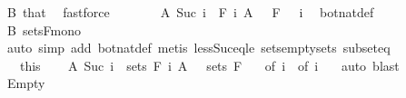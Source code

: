 \begin{isabellebody}
\ B\ that\ \isamarkupfalse%
\ fastforce\isanewline
\ \ \ \ \isamarkupfalse%
\ \isamarkupfalse%
\ {\isachardoublequoteopen}A\ {\isacharparenleft}{\kern0pt}Suc\ i{\isacharparenright}{\kern0pt}\ {\isasymin}\ F\ i{\isachardoublequoteclose}\ {\isachardoublequoteopen}A\ {}\ {\isasymin}\ F\ {}{\isachardoublequoteclose}\ \ i\ \isamarkupfalse%
\ bot{\isacharunderscore}{\kern0pt}nat{\isacharunderscore}{\kern0pt}def\ \isamarkupfalse%
\ B\ sets{\isacharunderscore}{\kern0pt}F{\isacharunderscore}{\kern0pt}mono\ \isamarkupfalse%
\ {\isacharparenleft}{\kern0pt}auto\ simp\ add{\isacharcolon}{\kern0pt}\ bot{\isacharunderscore}{\kern0pt}nat{\isacharunderscore}{\kern0pt}def{\isacharparenright}{\kern0pt}\ {\isacharparenleft}{\kern0pt}metis\ less{\isacharunderscore}{\kern0pt}Suc{\isacharunderscore}{\kern0pt}eq{\isacharunderscore}{\kern0pt}le\ sets{\isachardot}{\kern0pt}empty{\isacharunderscore}{\kern0pt}sets\ subset{\isacharunderscore}{\kern0pt}eq{\isacharparenright}{\kern0pt}\isanewline
\ \ \isacommand{{\isacharbraceright}{\kern0pt}}\isamarkupfalse%
\isanewline
\ \ \isamarkupfalse%
\ {\isacharasterisk}{\kern0pt}{\isacharasterisk}{\kern0pt}\ {\isacharequal}{\kern0pt}\ this\isanewline
\ \ \isamarkupfalse%
\ {\isachardoublequoteopen}A\ {\isacharparenleft}{\kern0pt}Suc\ i{\isacharparenright}{\kern0pt}\ {\isasymin}\ sets\ {\isacharparenleft}{\kern0pt}F\ i{\isacharparenright}{\kern0pt}{\isachardoublequoteclose}\ {\isachardoublequoteopen}A\ {}\ {\isasymin}\ sets\ {\isacharparenleft}{\kern0pt}F\ {}{\isacharparenright}{\kern0pt}{\isachardoublequoteclose}\ \isamarkupfalse%
\ {\isacharasterisk}{\kern0pt}{\isacharparenleft}{\kern0pt}{}{\isacharparenright}{\kern0pt}{\isacharbrackleft}{\kern0pt}of\ i{\isacharbrackright}{\kern0pt}\ {\isacharasterisk}{\kern0pt}{\isacharparenleft}{\kern0pt}{}{\isacharparenright}{\kern0pt}\ {\isacharasterisk}{\kern0pt}{\isacharasterisk}{\kern0pt}{\isacharparenleft}{\kern0pt}{}{\isacharparenright}{\kern0pt}{\isacharbrackleft}{\kern0pt}of\ i{\isacharbrackright}{\kern0pt}\ {\isacharasterisk}{\kern0pt}{\isacharasterisk}{\kern0pt}{\isacharparenleft}{\kern0pt}{}{\isacharparenright}{\kern0pt}\ \isamarkupfalse%
\ auto\ blast{\isacharplus}{\kern0pt}\ \isanewline
{}\isamarkupfalse%
\isanewline
\ \ \isamarkupfalse%
\ Empty\isanewline
\ \ \isacommand{{\isacharbraceleft}{\kern0pt}}\isamarkupfalse%

\end{isabellebody}
